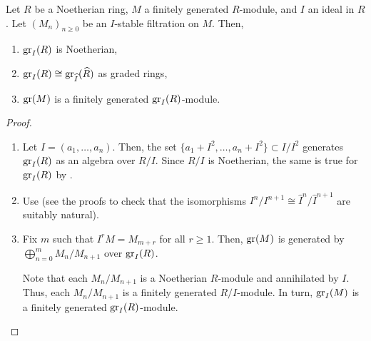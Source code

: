 \begin{prop} \label{prop:associated-graded-I-basic}
	Let $R$ be a Noetherian ring, $M$ a finitely generated $R$-module, and $I$ an ideal in $R$. Let $(M_{n})_{n \ge 0}$ be an $I$-stable filtration on $M$. Then,
	\begin{enumerate}[label=(\roman*)]
		\item $\operatorname{gr}_{I}(R)$ is Noetherian,
		\item $\operatorname{gr}_{I}(R) \cong \operatorname{gr}_{\widehat{I}}(\widehat{R})$ as graded rings,
		\item $\operatorname{gr}(M)$ is a finitely generated $\operatorname{gr}_{I}(R)$-module.
	\end{enumerate}
\end{prop}
\begin{proof} 
	\phantom{hi}
	\begin{enumerate}[label=(\roman*)]
		\item Let $I = (a_{1}, \ldots, a_{n})$. Then, the set $\{a_{1} + I^{2}, \ldots, a_{n} + I^{2}\} \subset I/I^{2}$ generates $\operatorname{gr}_{I}(R)$ as an algebra over $R/I$. Since $R/I$ is Noetherian, the same is true for $\operatorname{gr}_{I}(R)$ by .
		\item Use  (see the proofs to check that the isomorphisms $I^{n}/I^{n + 1} \cong \widehat{I}^{n}/\widehat{I}^{n + 1}$ are suitably natural).
		\item Fix $m$ such that $I^{r} M = M_{m + r}$ for all $r \ge 1$. Then, $\operatorname{gr}(M)$ is generated by $\bigoplus_{n = 0}^{m} M_{n}/M_{n + 1}$ over $\operatorname{gr}_{I}(R)$.

		Note that each $M_{n}/M_{n + 1}$ is a Noetherian $R$-module and annihilated by $I$. Thus, each $M_{n}/M_{n + 1}$ is a finitely generated $R/I$-module. In turn, $\operatorname{gr}_{I}(M)$ is a finitely generated $\operatorname{gr}_{I}(R)$-module. \qedhere
	\end{enumerate}
\end{proof}

